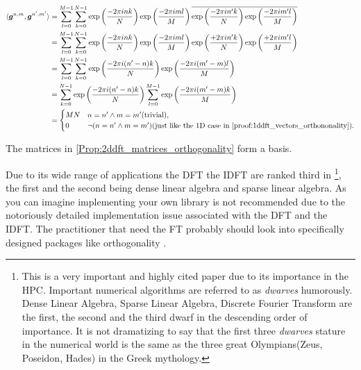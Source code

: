 \begin{Proof}
    \begin{equation}
        \begin{split}  
            \langle\boldsymbol{g}^{n,m},\boldsymbol{g}^{n',m'}\rangle &= \sum_{l=0}^{M-1}\sum_{k=0}^{N-1} \exp\left({\frac{-2\pi ink}{N}}\right)\exp\left({\frac{-2\pi iml}{M}}\right)\overline{\exp\left({\frac{-2\pi in'k}{N}}\right)\exp\left({\frac{-2\pi im'l}{M}}\right)}\\
            &= \sum_{l=0}^{M-1}\sum_{k=0}^{N-1} \exp\left({\frac{-2\pi ink}{N}}\right)\exp\left({\frac{-2\pi iml}{M}}\right)\exp\left({\frac{+2\pi in'k}{N}}\right)\exp\left({\frac{+2\pi im'l}{M}}\right)\\
            &= \sum_{l=0}^{M-1}\sum_{k=0}^{N-1} \exp\left({\frac{-2\pi i(n'-n)k}{N}}\right)\exp\left({\frac{-2\pi i(m'-m)l}{M}}\right)\\
            &= \sum_{k=0}^{N-1} \exp\left({\frac{-2\pi i(n'-n)k}{N}}\right)\sum_{l=0}^{M-1} \exp\left({\frac{-2\pi i(m'-m)k}{M}}\right)\\
            &=
            \begin{cases}
                MN & \text{$n = n' \wedge m=m'$}\text{(trivial)},\\
                0 & \text{$\neg(n = n' \wedge m=m')$}\text{(just like the 1D case in \cref{proof:1ddft_vectors_orthononality})}.
            \end{cases}  
        \end{split}
    \end{equation}    
\end{Proof}
\begin{Prop}
    The matrices in \cref{Prop:2ddft_matrices_orthogonality} form a basis.
\end{Prop}
\begin{Rem}
Due to its wide range of applications the \ac{DFT} the \ac{IDFT} are ranked third in \cite{KARBBCJGPHKKDPWLPJSSWWKY2006}
\footnote{This is a very important and highly cited paper due to its importance in the \ac{HPC}. Important numerical algorithms
are referred to as \emph{dwarves} humorously. Dense Linear Algebra, Sparse Linear Algebra, 
Discrete Fourier Transform are the first, the second and the third dwarf in the descending order of importance. 
It is not dramatizing to say that the first three \emph{dwarves} stature in the numerical world 
is the same as the three great Olympians(Zeus, Poseidon, Hades) in the Greek mythology.}, the first and the 
second being dense linear algebra and sparse linear algebra. As you can imagine implementing your own library is not recommended due to the notoriously detailed implementation issue associated with the \ac{DFT} and the \ac{IDFT}. 
The practitioner that need the \ac{FT} probably should look into specifically designed packages like \cite{KARBBCJGPHKKDPWLPJSSWWKY2006} orthogonality \cite{VGOHRCBPWBWBWMMNJKLCPFMVLPCHQHARPM2020}.
\end{Rem}
